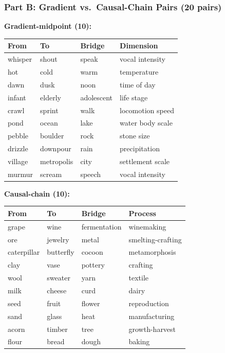 \subsubsection{Part B: Gradient vs.~Causal-Chain Pairs (20 pairs)}\label{part-b-gradient-vs.-causal-chain-pairs-20-pairs}

\textbf{Gradient-midpoint (10):}

\begin{longtable}[]{@{}llll@{}}
\toprule\noalign{}
From & To & Bridge & Dimension \\
\midrule\noalign{}
\endhead
\bottomrule\noalign{}
\endlastfoot
whisper & shout & speak & vocal intensity \\
hot & cold & warm & temperature \\
dawn & dusk & noon & time of day \\
infant & elderly & adolescent & life stage \\
crawl & sprint & walk & locomotion speed \\
pond & ocean & lake & water body scale \\
pebble & boulder & rock & stone size \\
drizzle & downpour & rain & precipitation \\
village & metropolis & city & settlement scale \\
murmur & scream & speech & vocal intensity \\
\end{longtable}

\textbf{Causal-chain (10):}

\begin{longtable}[]{@{}llll@{}}
\toprule\noalign{}
From & To & Bridge & Process \\
\midrule\noalign{}
\endhead
\bottomrule\noalign{}
\endlastfoot
grape & wine & fermentation & winemaking \\
ore & jewelry & metal & smelting-crafting \\
caterpillar & butterfly & cocoon & metamorphosis \\
clay & vase & pottery & crafting \\
wool & sweater & yarn & textile \\
milk & cheese & curd & dairy \\
seed & fruit & flower & reproduction \\
sand & glass & heat & manufacturing \\
acorn & timber & tree & growth-harvest \\
flour & bread & dough & baking \\
\end{longtable}

